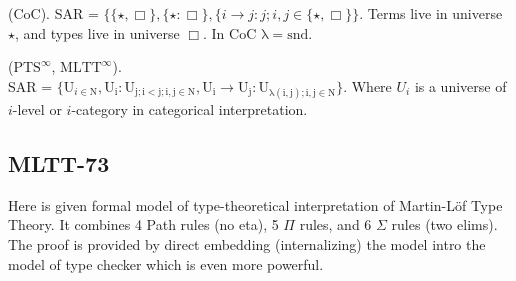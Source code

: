 \documentclass{article}
\begin{document}
\begin{example} (CoC). SAR = $\{ \{\star , \Box \},\{ \star : \Box \},
        \{ i \rightarrow j : j; i, j \in \{ \star, \Box \}
        \}$. Terms live in universe $\star$, and types live in universe $\Box$. In CoC $\mathrm{\lambda=snd}$.
\end{example}

\begin{example} ($\mathrm{PTS}^\infty$, $\mathrm{MLTT}^\infty$).\\ SAR = $\{ \mathrm{U}_{i \in \mathrm{N}},
    \mathrm{U_i : U_{j; i < j; i,j \in N}},
    \mathrm{U_i} \rightarrow \mathrm{U_j} : \mathrm{U_{\lambda(i,j); i,j \in \mathrm{N}}}
    \}$. Where $U_i$ is a universe of $i$-level or $i$-category in categorical interpretation.
\end{example}

\subsection{MLTT-73}
Here is given formal model of type-theoretical interpretation of Martin-Löf Type Theory.
It combines 4 Path rules (no eta), 5 $\Pi$ rules, and 6 $\Sigma$ rules (two elims).
The proof is provided by direct embedding (internalizing) the model intro the model
of type checker which is even more powerful.
\end{document}

